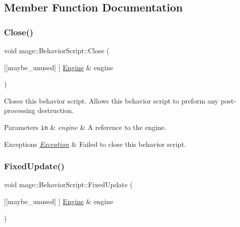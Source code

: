 \subsection{Member Function Documentation}
\mbox{\label{classmage_1_1_behavior_script_a5a8d2d38b369e193bf8cc20a74708397}} 
\subsubsection{\texorpdfstring{Close()}{Close()}}
{\footnotesize\ttfamily void mage\+::\+Behavior\+Script\+::\+Close (\begin{DoxyParamCaption}\item[{\mbox{[}\mbox{[}maybe\+\_\+unused\mbox{]} \mbox{]} \mbox{\hyperlink{classmage_1_1_engine}{Engine}} \&}]{engine }\end{DoxyParamCaption})\hspace{0.3cm}{\ttfamily [virtual]}}

Closes this behavior script. Allows this behavior script to preform any post-\/processing destruction.


\begin{DoxyParams}[1]{Parameters}
\mbox{\tt in}  & {\em engine} & A reference to the engine. \\
\hline
\end{DoxyParams}

\begin{DoxyExceptions}{Exceptions}
{\em \mbox{\hyperlink{classmage_1_1_exception}{Exception}}} & Failed to close this behavior script. \\
\hline
\end{DoxyExceptions}
\mbox{\label{classmage_1_1_behavior_script_ae4b9cb7f3ee9f96d69682aef42f8bb12}} 
\subsubsection{\texorpdfstring{Fixed\+Update()}{FixedUpdate()}}
{\footnotesize\ttfamily void mage\+::\+Behavior\+Script\+::\+Fixed\+Update (\begin{DoxyParamCaption}\item[{\mbox{[}\mbox{[}maybe\+\_\+unused\mbox{]} \mbox{]} \mbox{\hyperlink{classmage_1_1_engine}{Engine}} \&}]{engine }\end{DoxyParamCaption})\hspace{0.3cm}{\ttfamily [virtual]}}

